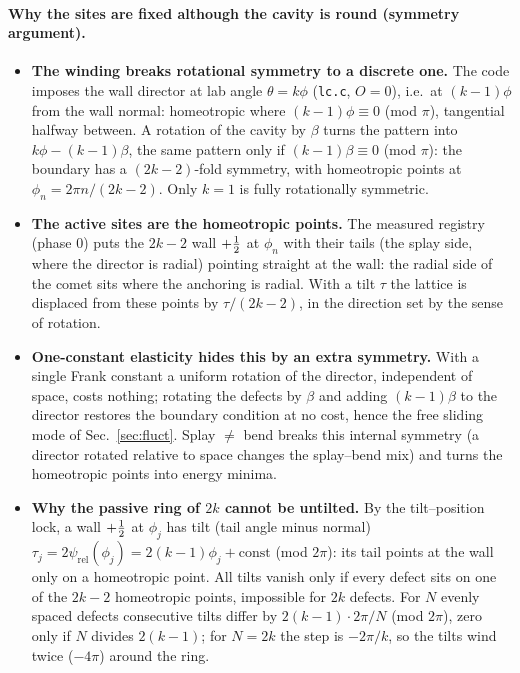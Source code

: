 \paragraph{Why the sites are fixed although the cavity is round (symmetry argument).}
\begin{itemize}
  \item \textbf{The winding breaks rotational symmetry to a discrete one.} The code imposes the wall director at lab angle $\theta=k\phi$ (\texttt{lc.c}, $O=0$),
        i.e.\ at $(k-1)\phi$ from the wall normal: homeotropic where $(k-1)\phi\equiv0$ (mod $\pi$), tangential halfway between. A rotation of the cavity by
        $\beta$ turns the pattern into $k\phi-(k-1)\beta$, the same pattern only if $(k-1)\beta\equiv0$ (mod $\pi$): the boundary has a $(2k-2)$-fold symmetry,
        with homeotropic points at $\phi_n=2\pi n/(2k-2)$. Only $k=1$ is fully rotationally symmetric.
  \item \textbf{The active sites are the homeotropic points.} The measured registry (phase 0) puts the $2k-2$ wall $+\tfrac12$ at $\phi_n$ with their tails
        (the splay side, where the director is radial) pointing straight at the wall: the radial side of the comet sits where the anchoring is radial. With a
        tilt $\tau$ the lattice is displaced from these points by $\tau/(2k-2)$, in the direction set by the sense of rotation.
  \item \textbf{One-constant elasticity hides this by an extra symmetry.} With a single Frank constant a uniform rotation of the director, independent of space,
        costs nothing; rotating the defects by $\beta$ and adding $(k-1)\beta$ to the director restores the boundary condition at no cost, hence the free sliding mode
        of Sec.~\ref{sec:fluct}. Splay $\neq$ bend breaks this internal symmetry (a director rotated relative to space changes the splay--bend mix) and turns the
        homeotropic points into energy minima.
  \item \textbf{Why the passive ring of $2k$ cannot be untilted.} By the tilt--position lock, a wall $+\tfrac12$ at $\phi_j$ has tilt (tail angle minus normal)
        $\tau_j=2\psi_\mathrm{rel}(\phi_j)=2(k-1)\phi_j+\text{const}$ (mod $2\pi$): its tail points at the wall only on a homeotropic point. All tilts vanish only if
        every defect sits on one of the $2k-2$ homeotropic points, impossible for $2k$ defects. For $N$ evenly spaced defects consecutive tilts differ by
        $2(k-1)\cdot2\pi/N$ (mod $2\pi$), zero only if $N$ divides $2(k-1)$; for $N=2k$ the step is $-2\pi/k$, so the tilts wind twice ($-4\pi$) around the ring.

\end{itemize}
